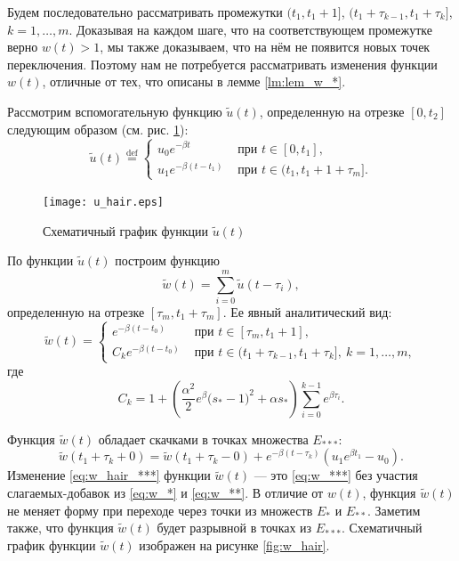 Будем последовательно рассматривать промежутки $(t_1,t_1+1]$, $(t_1+\tau_{k-1},t_1+\tau_k]$, $k = 1,\ldots,m$. Доказывая на каждом шаге, что на соответствующем промежутке верно $w(t) > 1$, мы также доказываем, что на нём не появится новых точек переключения. Поэтому нам не потребуется рассматривать изменения функции $w(t)$, отличные от тех, что описаны в лемме \ref{lm:lem_w_*}.

Рассмотрим вспомогательную функцию $\tilde{u}(t)$, определенную на отрезке $[0,t_2]$ следующим образом (см. рис. \ref{fig:u_hair}): 
\begin{equation}
	\label{eq:u_hair}
	\tilde{u}(t)\stackrel{\text{def}}{=}\left\lbrace\begin{array}{cl}
		u_0e^{-\beta t} & \text{ при } t\in[0,t_1],
		\\
		u_1e^{-\beta (t-t_1)} & \text{ при } t\in(t_1,t_1+1+\tau_m].
	\end{array}\right.
\end{equation}
%
\begin{figure}
	\centering
	\texttt{[image: u\_hair.eps]}
	\caption{Схематичный график функции $\tilde{u}(t)$}
	\label{fig:u_hair}
\end{figure}
%

По функции $\tilde{u}(t)$ построим функцию
%
\[
\tilde{w}(t) = \sum_{i=0}^{m}\tilde{u}(t-\tau_i),
\]
%
определенную на отрезке $[\tau_m, t_1 + \tau_m]$. Ее явный аналитический вид:
%
\begin{equation}
	\label{eq:w_hair}
	\tilde{w}(t)=
	\begin{cases}
		e^{-\beta (t-t_0)} & \text{ при } t\in[\tau_m,t_1+1],\\
		C_k e^{-\beta(t-t_0)} & \text{ при } t\in(t_1 + \tau_{k-1}, t_1 + \tau_k],\ k=1,\ldots,m,
	\end{cases}
\end{equation}
где
\[C_k = 1+\left(\frac{\alpha^2}{2}e^\beta\big( s_*-1)^2+\alpha s_*\right)\sum_{i=0}^{k-1}e^{\beta \tau_i}.\]

Функция $\tilde{w}(t)$ обладает скачками в точках %
множества $E_{***}$:
\begin{equation}
	\label{eq:w_hair_***} 
	\tilde{w}(t_1 + \tau_k+0) = \tilde{w}(t_1 + \tau_k-0)+
	e^{-\beta(t-\tau_k)}(u_1 e^{\beta t_1}-u_0).
\end{equation}
%
Изменение \eqref{eq:w_hair_***} функции $\tilde{w}(t)$ --- это \eqref{eq:w_***} без участия слагаемых-добавок из \eqref{eq:w_*} и \eqref{eq:w_**}. В отличие от $w(t)$, функция $\tilde{w}(t)$ не меняет форму при переходе через точки из множеств $E_*$ и $E_{**}$. Заметим также, что функция $\tilde{w}(t)$ будет разрывной в точках из $E_{***}$. Схематичный график функции $\tilde{w}(t)$ изображен на рисунке \ref{fig:w_hair}.

